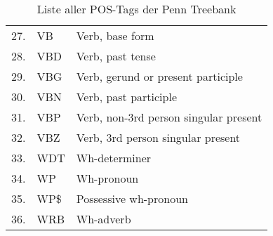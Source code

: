 \begin{table}[h!]
\begin{tabular}{|l|l|l|}
	27.& VB & Verb, base form\\
	28.& VBD & Verb, past tense\\
	29.& VBG & Verb, gerund or present participle\\
	30.& VBN & Verb, past participle\\
	31.& VBP & Verb, non-3rd person singular present\\
	32.& VBZ & Verb, 3rd person singular present\\
	33.& WDT & Wh-determiner\\
	34.& WP & Wh-pronoun\\
	35.& WP\$ & Possessive wh-pronoun\\
	36.& WRB & Wh-adverb	\\
	
	\bottomrule
  \end{tabular}
  \caption{Liste aller POS-Tags der Penn Treebank}
  \label{table:POSTAGS}
\end{table}

